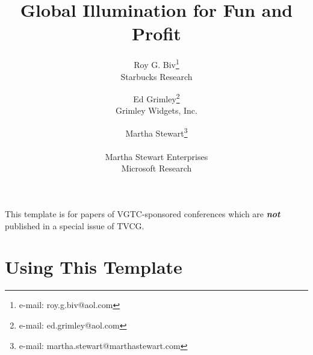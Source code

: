 \documentclass{vgtc}                          %
\title{Global Illumination for Fun and Profit}
\author{Roy G. Biv\thanks{e-mail: roy.g.biv@aol.com}\\ %
        \scriptsize Starbucks Research %
\and Ed Grimley\thanks{e-mail: ed.grimley@aol.com}\\ %
     \scriptsize Grimley Widgets, Inc. %
\and Martha Stewart\thanks{e-mail: martha.stewart@marthastewart.com}\\ %
     \parbox{1.4in}{\scriptsize \centering Martha Stewart Enterprises \\ Microsoft Research}}
\begin{document}


\maketitle

This template is for papers of VGTC-sponsored conferences which are \emph{\textbf{not}} published in a special issue of TVCG.

\section{Using This Template}
\end{document}
